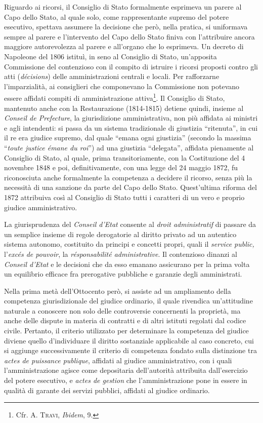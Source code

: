 \documentclass[12pt,it,a4paper,]{report}
\begin{document}
Riguardo ai ricorsi, il Consiglio di Stato formalmente esprimeva un
parere al Capo dello Stato, al quale solo, come rappresentante supremo
del potere esecutivo, spettava assumere la decisione che però, nella
pratica, si uniformava sempre al parere e l'intervento del Capo dello
Stato finiva con l'attribuire ancora maggiore autorevolezza al parere e
all'organo che lo esprimeva. Un decreto di Napoleone del 1806 istituì,
in seno al Consiglio di Stato, un'apposita Commissione del contenzioso
con il compito di istruire i ricorsi proposti contro gli atti
(\emph{décisions}) delle amministrazioni centrali e locali. Per
rafforzarne l'imparzialità, ai consiglieri che componevano la
Commissione non potevano essere affidati compiti di amministrazione
attiva\footnote{Cfr. A. \textsc{Travi}, \emph{Ibidem}, 9.}. Il Consiglio
di Stato, mantenuto anche con la Restaurazione (1814-1815) detiene
quindi, insieme al \emph{Conseil de Prefecture}, la giurisdizione
amministrativa, non più affidata ai ministri e agli intendenti: si passa
da un sistema tradizionale di giustizia ``ritenuta'', in cui il re era
giudice supremo, dal quale ``emana ogni giustizia'' (secondo la massima
``\emph{toute justice émane du roi}'') ad una giustizia ``delegata'',
affidata pienamente al Consiglio di Stato, al quale, prima
transitoriamente, con la Costituzione del 4 novembre 1848 e poi,
definitivamente, con una legge del 24 maggio 1872, fu riconosciuta anche
formalmente la competenza a decidere il ricorso, senza più la necessità
di una sanzione da parte del Capo dello Stato. Quest'ultima riforma del
1872 attribuiva così al Consiglio di Stato tutti i caratteri di un vero
e proprio giudice amministrativo.

La giurisprudenza del \emph{Conseil d'Etat} consente al \emph{droit
administratif} di passare da un semplice insieme di regole derogatorie
al diritto privato ad un autentico sistema autonomo, costituito da
principi e concetti propri, quali il \emph{service public,}
l'\emph{excés de pouvoir}, la \emph{résponsabilité administrative}. Il
contenzioso dinanzi al \emph{Conseil d'Etat} e le decisioni che da esso
emanano assicurano per la prima volta un equilibrio efficace fra
prerogative pubbliche e garanzie degli amministrati.

Nella prima metà dell'Ottocento però, si assiste ad un ampliamento della
competenza giurisdizionale del giudice ordinario, il quale rivendica
un'attitudine naturale a conoscere non solo delle controversie
concernenti la proprietà, ma anche delle dispute in materia di contratti
e di altri istituti regolati dal codice civile. Pertanto, il criterio
utilizzato per determinare la competenza del giudice diviene quello
d'individuare il diritto sostanziale applicabile al caso concreto, cui
si aggiunge successivamente il criterio di competenza fondato sulla
distinzione tra \emph{actes de puissance publique}, affidati al giudice
amministrativo, con i quali l'amministrazione agisce come depositaria
dell'autorità attribuita dall'esercizio del potere esecutivo, e
\emph{actes de gestion} che l'amministrazione pone in essere in qualità
di garante dei servizi pubblici, affidati al giudice ordinario.
\end{document}
